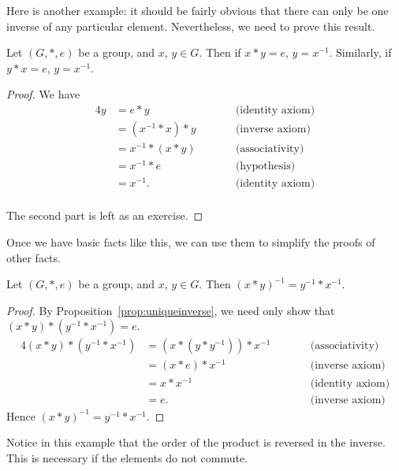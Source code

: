 Here is another example: it should be fairly obvious that there can only be
one inverse of any particular element.  Nevertheless, we need to prove this
result.

\begin{proposition}\label{prop:uniqueinverse}
  Let $(G, \ast, e)$ be a group, and $x$, $y \in G$.  Then if $x \ast y = e$,
  $y = x^{-1}$.  Similarly, if $y \ast x = e$, $y = x^{-1}$.
\end{proposition}
\begin{proof}
  We have
  \begin{alignat*}{4}
    y &= e \ast y &\qquad &\text{(identity axiom)} \\
      &= (x^{-1} \ast x) \ast y &&\text{(inverse axiom)}\\
      &= x^{-1} \ast (x \ast y) &&\text{(associativity)}\\
      &= x^{-1} \ast e &&\text{(hypothesis)}\\
      &= x^{-1}. &&\text{(identity axiom)}\\
  \end{alignat*}
  
  The second part is left as an exercise.
\end{proof}

Once we have basic facts like this, we can use them to simplify the proofs
of other facts.

\begin{proposition}
  Let $(G, \ast, e)$ be a group, and $x$, $y \in G$.  Then $(x \ast y)^{-1} =
  y^{-1} \ast x^{-1}$.
\end{proposition}
\begin{proof}
  By Proposition~\ref{prop:uniqueinverse}, we need only show that
  $(x \ast y) \ast (y^{-1} \ast x^{-1}) = e$.
  \begin{alignat*}{4}
    (x \ast y) \ast (y^{-1} \ast x^{-1})
      &= (x \ast (y \ast y^{-1})) \ast x^{-1} &\qquad &\text{(associativity)} \\
      &= (x \ast e) \ast x^{-1} &\qquad &\text{(inverse axiom)} \\
      &= x \ast x^{-1} &\qquad &\text{(identity axiom)} \\
      &= e. &\qquad &\text{(inverse axiom)}
  \end{alignat*}
  Hence $(x \ast y)^{-1} = y^{-1} \ast x^{-1}$.
\end{proof}

Notice in this example that the order of the product is reversed in the
inverse.  This is necessary if the elements do not commute.

